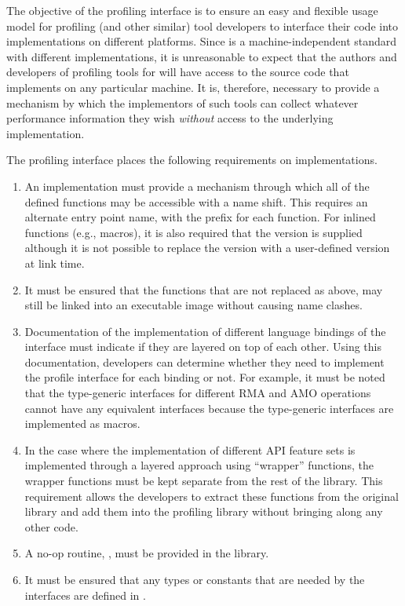 The objective of the \openshmem profiling interface is to ensure an
easy and flexible usage model for profiling (and other similar)
tool developers to interface their code into \openshmem
implementations on different platforms. Since \openshmem is a
machine-independent standard with different implementations, it is
unreasonable to expect that the authors and developers of profiling
tools for \openshmem will have access to the source code that
implements \openshmem on any particular machine. It is, therefore,
necessary to provide a mechanism by which the implementors of such
tools can collect whatever performance information they wish
\emph{without} access to the underlying implementation.

The \openshmem profiling interface places the following requirements
on implementations.

\begin{enumerate}
\item An \openshmem implementation must provide a mechanism through
which all of the \openshmem defined functions may be accessible
with a name shift. This requires an alternate
entry point name, with the prefix  for each
\openshmem function. For \openshmem inlined functions (e.g., macros),
it is also required that the  version is supplied
although it is not possible to replace the  version
with a user-defined version at link time.
\item It must be ensured that the \openshmem functions that are not
replaced as above, may still be linked into an executable image
without causing name clashes.
\item Documentation of the implementation of different language
bindings of the \openshmem interface must indicate if they
are layered on top of each other. Using this documentation,
developers can determine whether they need to implement the
profile interface for each binding or not. For example, it must
be noted that the \openshmem \Cstd[11] type-generic interfaces for
different \ac{RMA} and \ac{AMO} operations cannot have any equivalent
 interfaces because the \Cstd[11] type-generic
interfaces are implemented as macros.
\item In the case where the implementation of different \ac{API}
feature sets is implemented through a layered approach using
``wrapper'' functions, the wrapper functions must be kept separate
from the rest of the library. This requirement allows the developers
to extract these functions from the original \openshmem library
and add them into the profiling library without bringing along any
other code.
\item A no-op routine, , must be provided
in the \openshmem library.
\item It must be ensured that any \openshmem types or constants that are
needed by the  interfaces are defined in .
\end{enumerate}

